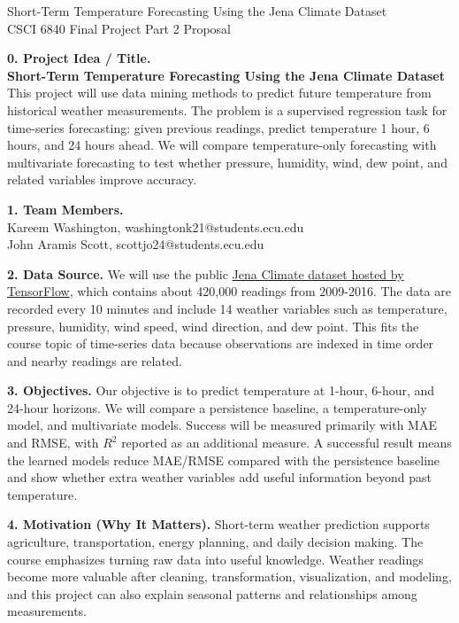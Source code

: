 \documentclass[11pt]{article}
\begin{document}
\begin{center}
{\large Short-Term Temperature Forecasting Using the Jena Climate Dataset}\\
CSCI 6840 Final Project Part 2 Proposal
\end{center}

\noindent\textbf{0. Project Idea / Title.}\\
\textbf{Short-Term Temperature Forecasting Using the Jena Climate Dataset}\\
This project will use data mining methods to predict future temperature from historical weather measurements. The problem is a supervised regression task for time-series forecasting: given previous readings, predict temperature 1 hour, 6 hours, and 24 hours ahead. We will compare temperature-only forecasting with multivariate forecasting to test whether pressure, humidity, wind, dew point, and related variables improve accuracy.

\medskip
\noindent\textbf{1. Team Members.}\\
Kareem Washington, washingtonk21@students.ecu.edu\\
John Aramis Scott, scottjo24@students.ecu.edu

\medskip
\noindent\textbf{2. Data Source.}
We will use the public \href{https://storage.googleapis.com/tensorflow/tf-keras-datasets/jena_climate_2009_2016.csv.zip}{Jena Climate dataset hosted by TensorFlow}, which contains about 420,000 readings from 2009-2016. The data are recorded every 10 minutes and include 14 weather variables such as temperature, pressure, humidity, wind speed, wind direction, and dew point. This fits the course topic of time-series data because observations are indexed in time order and nearby readings are related.

\medskip
\noindent\textbf{3. Objectives.}
Our objective is to predict temperature at 1-hour, 6-hour, and 24-hour horizons. We will compare a persistence baseline, a temperature-only model, and multivariate models. Success will be measured primarily with MAE and RMSE, with $R^2$ reported as an additional measure. A successful result means the learned models reduce MAE/RMSE compared with the persistence baseline and show whether extra weather variables add useful information beyond past temperature.

\medskip
\noindent\textbf{4. Motivation (Why It Matters).}
Short-term weather prediction supports agriculture, transportation, energy planning, and daily decision making. The course emphasizes turning raw data into useful knowledge. Weather readings become more valuable after cleaning, transformation, visualization, and modeling, and this project can also explain seasonal patterns and relationships among measurements.
\end{document}
